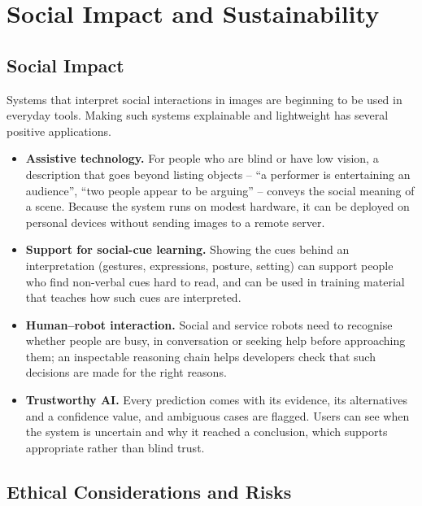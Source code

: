 \documentclass[12pt,a4paper,oneside]{report}
\begin{document}
\chapter{Social Impact and Sustainability}
\label{ch:impact}

\section{Social Impact}

Systems that interpret social interactions in images are beginning to be used
in everyday tools. Making such systems explainable and lightweight has several
positive applications.

\begin{itemize}[leftmargin=*]
\item \textbf{Assistive technology.} For people who are blind or have low
  vision, a description that goes beyond listing objects -- ``a performer is
  entertaining an audience'', ``two people appear to be arguing'' -- conveys
  the social meaning of a scene. Because the system runs on modest hardware, it
  can be deployed on personal devices without sending images to a remote
  server.
\item \textbf{Support for social-cue learning.} Showing the cues behind an
  interpretation (gestures, expressions, posture, setting) can support people
  who find non-verbal cues hard to read, and can be used in training material
  that teaches how such cues are interpreted.
\item \textbf{Human--robot interaction.} Social and service robots need to
  recognise whether people are busy, in conversation or seeking help before
  approaching them; an inspectable reasoning chain helps developers check that
  such decisions are made for the right reasons.
\item \textbf{Trustworthy AI.} Every prediction comes with its evidence, its
  alternatives and a confidence value, and ambiguous cases are flagged. Users
  can see when the system is uncertain and why it reached a conclusion, which
  supports appropriate rather than blind trust.
\end{itemize}

\section{Ethical Considerations and Risks}
\end{document}
